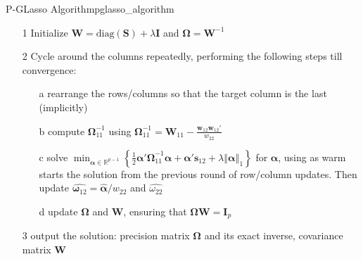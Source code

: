 \documentclass[twoside]{article}
\begin{document}
\begin{algorithm}{P-GLasso Algorithm}{pglasso_algorithm}
    \begin{itemize}
        \item[1] Initialize $\mathbf{W} = \mathrm{diag}(\mathbf{S}) + \lambda\mathbf{I}$ and $\boldsymbol{\Omega} = \mathbf{W}^{-1}$
        \item[2] Cycle around the columns repeatedly, performing the following steps till convergence:
        \begin{itemize}
            \item[a] rearrange the rows/columns so that the target column is the last (implicitly)
            \item[b] compute $\mathbf{\Omega}^{-1}_{11}$ using $\boldsymbol{\Omega}^{-1}_{11}=\mathbf{W}_{11}-\frac{\mathbf{w}_{12}\mathbf{w}_{12}'}{w_{22}}$
            \item[c] solve $\min_{\boldsymbol{\alpha}\in\mathbb{R}^{p-1}}\left\{ \frac{1}{2}\boldsymbol{\alpha'\Omega}_{11}^{-1}\boldsymbol{\alpha} + \boldsymbol{\alpha}'\mathbf{s}_{12} + \lambda\left\Vert \boldsymbol{\alpha}\right\Vert _1 \right\} $ for $\boldsymbol{\alpha}$, using as warm starts the solution from the previous round of row/column updates. Then update $\hat{\boldsymbol{\omega}_{12}} = \hat{\boldsymbol{\alpha}}/w_{22}$ and $\hat{\omega_{22}}$
            \item[d] update $\boldsymbol{\Omega}$ and $\mathbf{W}$, ensuring that $\boldsymbol{\Omega}\mathbf{W} = \mathbf{I}_p$
        \end{itemize}
        \item[3] output the solution: precision matrix $\boldsymbol{\Omega}$ and its exact inverse, covariance matrix $\mathbf{W}$
    \end{itemize}
\end{algorithm}


\newpage


\end{document}

